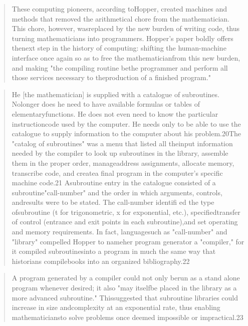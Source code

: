 \begin{quotation}
These computing pioneers, according toHopper, created machines and methods that removed the arithmetical chore from the mathematician. This chore, however, wasreplaced by the new burden of writing code, thus turning mathematicians into programmers. Hopper's paper boldly offers thenext step in the history of computing: shifting the human-machine interface once again so as to free the mathematicianfrom this new burden, and making "the compiling routine bethe programmer and perform all those services necessary to theproduction of a finished program."\end{quotation}
\begin{quotation}
He [the mathematician] is supplied with a catalogue of subroutines. Nolonger does he need to have available formulas or tables of elementaryfunctions. He does not even need to know the particular instructioncode used by the computer. He needs only to be able to use the catalogue to supply information to the computer about his problem.20The "catalog of subroutines" was a menu that listed all theinput information needed by the compiler to look up subroutines in the library, assemble them in the proper order, manageaddress assignments, allocate memory, transcribe code, and createa final program in the computer's specific machine code.21 Asubroutine entry in the catalogue consisted of a subroutine"call-number" and the order in which arguments, controls, andresults were to be stated. The call-number identifi ed the type ofsubroutine (t for trigonometric, x for exponential, etc.), specifiedtransfer of control (entrance and exit points in each subroutine),and set operating and memory requirements. In fact, languagesuch as "call-number" and "library" compelled Hopper to nameher program generator a "compiler," for it compiled subroutinesinto a program in much the same way that historians compilebooks into an organized bibliography.22\end{quotation}
\begin{quotation}
A program generated by a compiler could not only berun as a stand alone program whenever desired; it also "may itselfbe placed in the library as a more advanced subroutine." Thissuggested that subroutine libraries could increase in size andcomplexity at an exponential rate, thus enabling mathematiciansto solve problems once deemed impossible or impractical.23\end{quotation}
